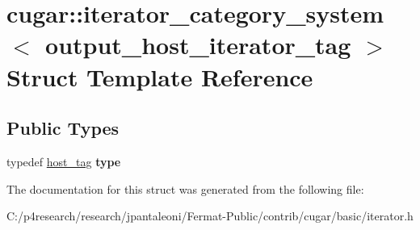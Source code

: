 \hypertarget{structcugar_1_1iterator__category__system_3_01output__host__iterator__tag_01_4}{}\section{cugar\+:\+:iterator\+\_\+category\+\_\+system$<$ output\+\_\+host\+\_\+iterator\+\_\+tag $>$ Struct Template Reference}
\label{structcugar_1_1iterator__category__system_3_01output__host__iterator__tag_01_4}
\subsection*{Public Types}
\begin{DoxyCompactItemize}
\item 
\mbox{\label{structcugar_1_1iterator__category__system_3_01output__host__iterator__tag_01_4_a85a731aa3b45db371ac0881360be408f}} 
typedef \hyperlink{structcugar_1_1host__tag}{host\+\_\+tag} {\bfseries type}
\end{DoxyCompactItemize}


The documentation for this struct was generated from the following file\+:\begin{DoxyCompactItemize}
\item 
C\+:/p4research/research/jpantaleoni/\+Fermat-\/\+Public/contrib/cugar/basic/iterator.\+h\end{DoxyCompactItemize}
